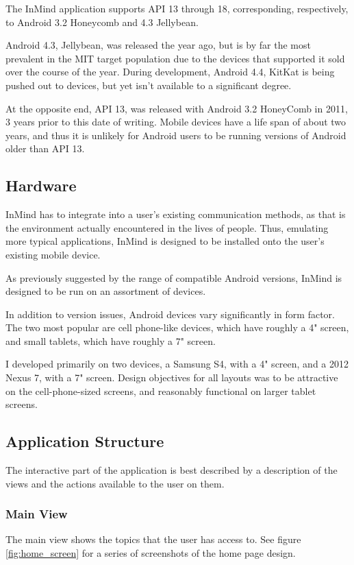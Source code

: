     The InMind application supports API 13 through 18, 
    corresponding, respectively, to Android 3.2 Honeycomb and 4.3 Jellybean.

    Android 4.3, Jellybean, was released the year ago, but is by far
    the most prevalent in the MIT target population due to the devices
    that supported it sold over the course of the year.
    During development, Android 4.4, KitKat is being pushed out to devices,
    but yet isn't available to a significant degree.

    At the opposite end, API 13, was released with Android 3.2 HoneyComb
    in 2011, 3 years prior to this date of writing.
    Mobile devices have a life span of about two years,
    and thus it is unlikely for Android users to be
    running versions of Android older than API 13.

    \subsection{Hardware}
    InMind has to integrate into a user's existing communication methods,
    as that is the environment actually encountered in the lives of people.
    Thus, emulating more typical applications,
    InMind is designed to be installed onto the user's existing mobile device.

    As previously suggested by the range of compatible Android versions,
    InMind is designed to be run on an assortment of devices.
    
    In addition to version issues, Android devices vary significantly in form factor.
    The two most popular are cell phone-like devices, which have roughly a 4" screen,
    and small tablets, which have roughly a 7" screen.

    I developed primarily on two devices, a Samsung S4, with a 4" screen,
    and a 2012 Nexus 7, with a 7" screen.
    Design objectives for all layouts was to be attractive on the cell-phone-sized screens,
    and reasonably functional on larger tablet screens.

    \subsection{Application Structure}
    The interactive part of the application is best described by a description of the views
    and the actions available to the user on them.
      \subsubsection{Main View}
      The main view shows the topics that the user has access to.
      See figure \ref{fig:home_screen} for a series of screenshots of the home page design.

